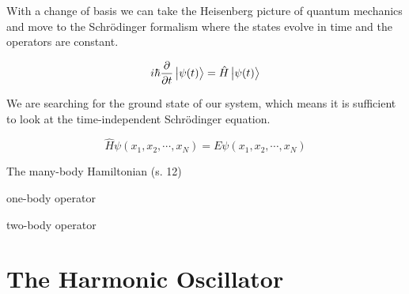With a change of basis we can take the Heisenberg picture of quantum mechanics and move to the Schrödinger formalism where the states evolve in time and the operators are constant. 

\begin{equation}
i \hbar \frac{\partial}{\partial t} \ket{\psi(t)} = \hat{H} \ket{\psi(t)}
\end{equation}

We are searching for the ground state of our system, which means it is sufficient to look at the time-independent Schrödinger equation.

\begin{equation}
\hat{H} \psi(x_1, x_2, \cdots, x_N) = E \psi (x_1, x_2, \cdots, x_N)
\end{equation}

The many-body Hamiltonian (s. 12) 

one-body operator  

two-body operator

\section{The Harmonic Oscillator}

